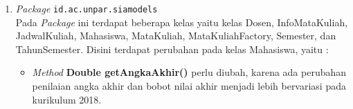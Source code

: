 \begin{enumerate}
	\item \textit{Package} \texttt{id.ac.unpar.siamodels}\\
	Pada \textit{Package} ini terdapat beberapa kelas yaitu kelas Dosen, InfoMataKuliah, JadwalKuliah, Mahasiswa, MataKuliah, MataKuliahFactory, Semester, dan TahunSemester. Disini terdapat perubahan pada kelas Mahasiswa, yaitu :
	\begin{itemize}
		\item \textit{Method} \textbf{Double getAngkaAkhir()} perlu diubah, karena ada perubahan penilaian angka akhir dan bobot nilai akhir menjadi lebih bervariasi pada kurikulum 2018.
	\end{itemize}
\end{enumerate}
